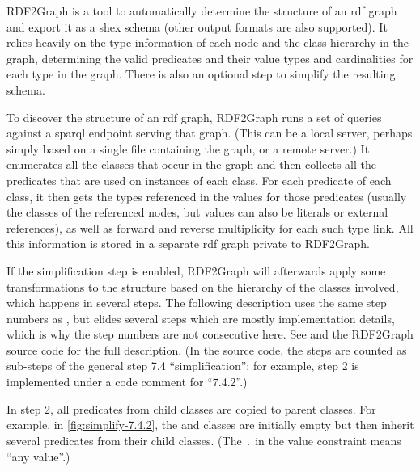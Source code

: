 \Gls{RDF2Graph} \cite{vanDam2015}
is a tool to automatically determine the structure of an \gls{rdf} graph
and export it as a \gls{shex} \gls{schema}
(other output formats are also supported).
It relies heavily on the type information of each node and the class hierarchy in the graph,
determining the valid \glspl{predicate} and their value types and cardinalities for each type in the graph.
There is also an optional step to simplify the resulting \gls{schema}.

To discover the structure of an \gls{rdf} graph,
\gls{RDF2Graph} runs a set of queries against a \gls{sparql} endpoint serving that graph.
(This can be a local server, perhaps simply based on a single file containing the graph,
or a remote server.)
It enumerates all the classes that occur in the graph
and then collects all the \glspl{predicate} that are used on instances of each class.
For each \gls{predicate} of each class,
it then gets the types referenced in the values for those \glspl{predicate}
(usually the classes of the referenced nodes,
but values can also be literals or external references),
as well as forward and reverse multiplicity for each such \gls{type link}.
All this information is stored in a separate \gls{rdf} graph private to \gls{RDF2Graph}.

If the simplification step is enabled,
\gls{RDF2Graph} will afterwards apply some transformations to the structure
based on the hierarchy of the classes involved,
which happens in several steps.
The following description uses the same step numbers as \cite{vanDam2015},
but elides several steps which are mostly implementation details,
which is why the step numbers are not consecutive here.
See \cite{vanDam2015} and the \gls{RDF2Graph} source code for the full description.
(In the source code, the steps are counted as sub-steps of the general step 7.4 “simplification”:
for example, step 2 is implemented under a code comment for “7.4.2”.)

In step 2, all \glspl{predicate} from child classes are copied to parent classes.
For example, in \cref{fig:simplify-7.4.2},
the  and  classes are initially empty
but then inherit several \glspl{predicate} from their child classes.
(The \lstinline{.} in the  \gls{value constraint} means “any value”.)

